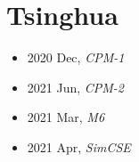 \section{Tsinghua}\label{com:Tsinghua}

\begin{itemize}
    \item 2020 Dec, \textit{CPM-1}\cite{CPM-1}
    \item 2021 Jun, \textit{CPM-2}\cite{CPM-2}
    \item 2021 Mar, \textit{M6}\cite{M6}
    \item 2021 Apr, \textit{SimCSE}\cite{SimCSE}
\end{itemize}